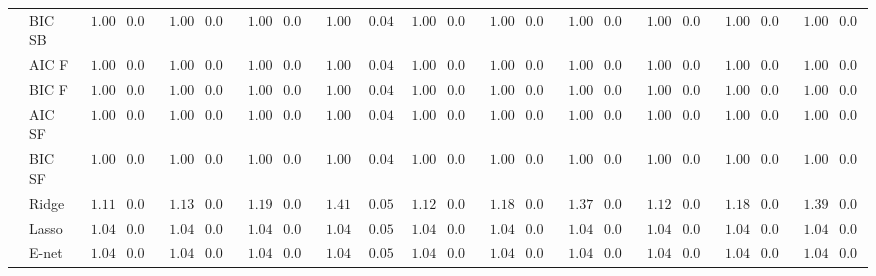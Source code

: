 \begin{tabular}{llllllllllllllllllllll}
	& BIC SB  & $\phantom{0}1.00$ & $0.04$ & $\phantom{0}1.00$ & $0.04$ & $\phantom{0}1.00$ & $0.04$ & $\phantom{0}1.00$ & $\phantom{0}0.04$ & $\phantom{0}1.00$ & $0.04$ & $\phantom{0}1.00$ & $0.04$ & $\phantom{0}1.00$ & $0.04$ & $\phantom{0}1.00$ & $0.04$ & $\phantom{0}1.00$ & $0.04$ & $\phantom{0}1.00$ & $0.04$ \\
	& AIC F  & $\phantom{0}1.00$ & $0.04$ & $\phantom{0}1.00$ & $0.04$ & $\phantom{0}1.00$ & $0.04$ & $\phantom{0}1.00$ & $\phantom{0}0.04$ & $\phantom{0}1.00$ & $0.04$ & $\phantom{0}1.00$ & $0.04$ & $\phantom{0}1.00$ & $0.04$ & $\phantom{0}1.00$ & $0.04$ & $\phantom{0}1.00$ & $0.04$ & $\phantom{0}1.00$ & $0.04$ \\
	& BIC F  & $\phantom{0}1.00$ & $0.04$ & $\phantom{0}1.00$ & $0.04$ & $\phantom{0}1.00$ & $0.04$ & $\phantom{0}1.00$ & $\phantom{0}0.04$ & $\phantom{0}1.00$ & $0.04$ & $\phantom{0}1.00$ & $0.04$ & $\phantom{0}1.00$ & $0.04$ & $\phantom{0}1.00$ & $0.04$ & $\phantom{0}1.00$ & $0.04$ & $\phantom{0}1.00$ & $0.04$ \\
	& AIC SF  & $\phantom{0}1.00$ & $0.04$ & $\phantom{0}1.00$ & $0.04$ & $\phantom{0}1.00$ & $0.04$ & $\phantom{0}1.00$ & $\phantom{0}0.04$ & $\phantom{0}1.00$ & $0.04$ & $\phantom{0}1.00$ & $0.04$ & $\phantom{0}1.00$ & $0.04$ & $\phantom{0}1.00$ & $0.04$ & $\phantom{0}1.00$ & $0.04$ & $\phantom{0}1.00$ & $0.04$ \\
	& BIC SF  & $\phantom{0}1.00$ & $0.04$ & $\phantom{0}1.00$ & $0.04$ & $\phantom{0}1.00$ & $0.04$ & $\phantom{0}1.00$ & $\phantom{0}0.04$ & $\phantom{0}1.00$ & $0.04$ & $\phantom{0}1.00$ & $0.04$ & $\phantom{0}1.00$ & $0.04$ & $\phantom{0}1.00$ & $0.04$ & $\phantom{0}1.00$ & $0.04$ & $\phantom{0}1.00$ & $0.04$ \\
	& Ridge  & $\phantom{0}1.11$ & $0.05$ & $\phantom{0}1.13$ & $0.05$ & $\phantom{0}1.19$ & $0.05$ & $\phantom{0}1.41$ & $\phantom{0}0.05$ & $\phantom{0}1.12$ & $0.05$ & $\phantom{0}1.18$ & $0.05$ & $\phantom{0}1.37$ & $0.05$ & $\phantom{0}1.12$ & $0.05$ & $\phantom{0}1.18$ & $0.05$ & $\phantom{0}1.39$ & $0.05$ \\
	& Lasso  & $\phantom{0}1.04$ & $0.05$ & $\phantom{0}1.04$ & $0.05$ & $\phantom{0}1.04$ & $0.05$ & $\phantom{0}1.04$ & $\phantom{0}0.05$ & $\phantom{0}1.04$ & $0.05$ & $\phantom{0}1.04$ & $0.05$ & $\phantom{0}1.04$ & $0.05$ & $\phantom{0}1.04$ & $0.05$ & $\phantom{0}1.04$ & $0.05$ & $\phantom{0}1.04$ & $0.05$ \\
	& E-net  & $\phantom{0}1.04$ & $0.05$ & $\phantom{0}1.04$ & $0.05$ & $\phantom{0}1.04$ & $0.05$ & $\phantom{0}1.04$ & $\phantom{0}0.05$ & $\phantom{0}1.04$ & $0.05$ & $\phantom{0}1.04$ & $0.05$ & $\phantom{0}1.04$ & $0.05$ & $\phantom{0}1.04$ & $0.05$ & $\phantom{0}1.04$ & $0.05$ & $\phantom{0}1.04$ & $0.05$ \\

\end{tabular}
